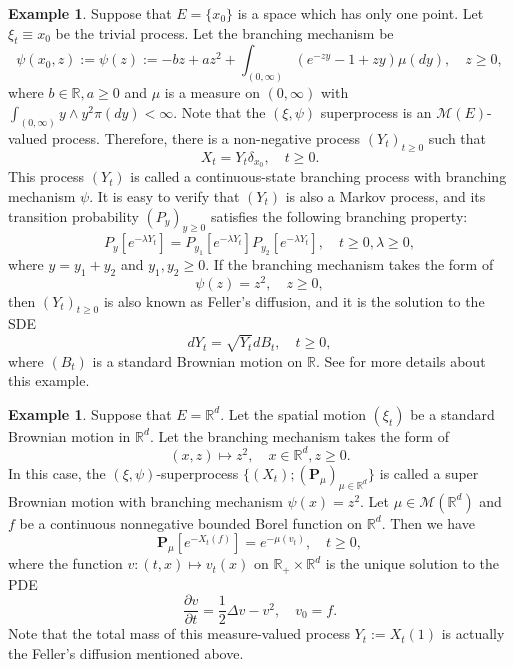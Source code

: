 \documentclass[UTF8]{pkuthss}
\theoremstyle{plain}
\theoremstyle{definition}
\newtheorem{exa}[thm]{Example}
\numberwithin{equation}{section}
\begin{document}
\begin{exa}
	Suppose that $E=\{x_0\}$ is a space which has only one point. Let $\xi_t \equiv x_0$ be the trivial process. Let the branching mechanism be
\begin{equation}
\label{eq: psi for CSBP}
	\psi(x_0,z):=\psi(z) := -b z + a z^2 + \int_{(0,\infty)}(e^{-zy}-1+zy)\mu(dy) ,\quad z\geq 0,
\end{equation}
	where $b\in \mathbb R, a \geq 0$ and $\mu$ is a measure on $(0,\infty)$ with $\int_{(0,\infty)} y \wedge y^2 \pi(dy) < \infty$. 
	Note that the $(\xi,\psi)$ superprocess is an $\mathcal M(E)$-valued process. Therefore, there is a non-negative process $(Y_t)_{t\geq 0}$ such that
\[
	X_t = Y_t \delta_{x_0},\quad t\geq 0.
\]
	This process $(Y_t)$ is called a continuous-state branching process with branching mechanism $\psi$.
	It is easy to verify that $(Y_t)$ is also a Markov process, and its transition probability $(P_y)_{y\geq 0}$ satisfies the following branching property:
\[
	P_y[e^{-\lambda Y_t}] = P_{y_1}[e^{-\lambda Y_t}] P_{y_2}[e^{-\lambda Y_t}],\quad t\geq 0,\lambda \geq 0,
\]  
	where $y = y_1+y_2$ and $y_1,y_2\geq 0$. 
	If the branching mechanism takes the form of 
\begin{equation}
\label{eq: branching mechanism for CSBP}
	\psi(z) = z^2, \quad z\geq 0,
\end{equation}
	then $(Y_t)_{t\geq 0}$ is also known as Feller's diffusion, and it is the solution to the SDE
\[
	dY_t = \sqrt{Y_t} dB_t, \quad t\geq 0,
\]
	where $(B_t)$ is a standard Brownian motion on $\mathbb R$.
	See \cite{Li2011Measure-valued} for more details about this example.
\end{exa}

\begin{exa}
	Suppose that $E = \mathbb R^d$. Let the spatial motion $(\xi_t)$ be a standard Brownian motion in $\mathbb R^d$. Let the branching mechanism takes the form of
\[
	(x,z) \mapsto z^{2}, \quad x\in \mathbb R^d, z\geq 0.
\]
	In this case, the $(\xi,\psi)$-superprocess $\{(X_t);(\mathbf P_\mu)_{\mu \in \mathbb R^d}\}$ is called a super Brownian motion with branching mechanism $\psi(x)=z^2$. Let $\mu \in \mathcal M(\mathbb R^d)$ and $f$ be a continuous nonnegative bounded Borel function on $\mathbb R^d$.
	Then we have
\[
	\mathbf P_\mu[e^{- X_t(f)}] = e^{-\mu(v_t)},\quad t\geq 0,
\]
	where the function $v:(t,x)\mapsto v_t(x)$ on $\mathbb R_+\times \mathbb R^d$ is the unique solution to the PDE
\[
	\frac{\partial v}{\partial t} = \frac{1}{2} \Delta v - v^{2},
	\quad v_0 = f. 
\]
	Note that the total mass of this measure-valued process $Y_t:=X_t(1)$ is actually the Feller's diffusion mentioned above.
\end{exa}
	
\end{document}
